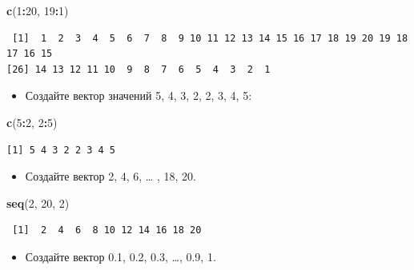 \documentclass[
]{book}
\newenvironment{Shaded}{\begin{snugshade}}{\end{snugshade}}
\newcommand{\DecValTok}[1]{\textcolor[rgb]{0.00,0.00,0.81}{#1}}
\newcommand{\KeywordTok}[1]{\textcolor[rgb]{0.13,0.29,0.53}{\textbf{#1}}}
\newcommand{\NormalTok}[1]{#1}
\newcommand{\OperatorTok}[1]{\textcolor[rgb]{0.81,0.36,0.00}{\textbf{#1}}}
\providecommand{\tightlist}{%
  \setlength{\itemsep}{0pt}\setlength{\parskip}{0pt}}
\begin{document}
\begin{Shaded}
\begin{Highlighting}[]
\KeywordTok{c}\NormalTok{(}\DecValTok{1}\OperatorTok{:}\DecValTok{20}\NormalTok{, }\DecValTok{19}\OperatorTok{:}\DecValTok{1}\NormalTok{)}
\end{Highlighting}
\end{Shaded}

\begin{verbatim}
 [1]  1  2  3  4  5  6  7  8  9 10 11 12 13 14 15 16 17 18 19 20 19 18 17 16 15
[26] 14 13 12 11 10  9  8  7  6  5  4  3  2  1
\end{verbatim}

\begin{itemize}
\tightlist
\item
  Создайте вектор значений 5, 4, 3, 2, 2, 3, 4, 5:
\end{itemize}

\begin{Shaded}
\begin{Highlighting}[]
\KeywordTok{c}\NormalTok{(}\DecValTok{5}\OperatorTok{:}\DecValTok{2}\NormalTok{, }\DecValTok{2}\OperatorTok{:}\DecValTok{5}\NormalTok{)}
\end{Highlighting}
\end{Shaded}

\begin{verbatim}
[1] 5 4 3 2 2 3 4 5
\end{verbatim}

\begin{itemize}
\tightlist
\item
  Создайте вектор 2, 4, 6, \ldots{} , 18, 20.
\end{itemize}

\begin{Shaded}
\begin{Highlighting}[]
\KeywordTok{seq}\NormalTok{(}\DecValTok{2}\NormalTok{, }\DecValTok{20}\NormalTok{, }\DecValTok{2}\NormalTok{)}
\end{Highlighting}
\end{Shaded}

\begin{verbatim}
 [1]  2  4  6  8 10 12 14 16 18 20
\end{verbatim}

\begin{itemize}
\tightlist
\item
  Создайте вектор 0.1, 0.2, 0.3, \ldots, 0.9, 1.
\end{itemize}
\end{document}

